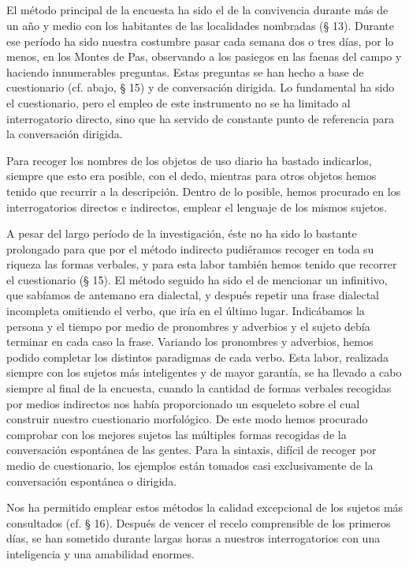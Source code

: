 \subsection{} El método principal de la encuesta ha sido el de la convivencia durante más de un año y medio con los habitantes de las localidades nombradas (§ 13). Durante ese período ha sido nuestra costumbre pasar cada semana dos o tres días, por lo menos, en los Montes de Pas, observando a los pasiegos en las faenas del campo y haciendo innumerables preguntas. Estas preguntas se han hecho a base de cuestionario (cf. abajo, § 15) y de conversación dirigida. Lo fundamental ha sido el cuestionario, pero el empleo de este instrumento no se ha limitado al interrogatorio directo, sino que ha servido de constante punto de referencia para la conversación dirigida. 

Para recoger los nombres de los objetos de uso diario ha bastado indicarlos, siempre que esto era posible, con el dedo, mientras para otros objetos hemos tenido que recurrir a la descripción. Dentro de lo posible, hemos procurado en los interrogatorios directos e indirectos, emplear el lenguaje de los mismos sujetos. 

A pesar del largo período de la investigación, éste no ha sido lo bastante prolongado para que por el método indirecto pudiéramos recoger en toda su riqueza las formas verbales, y para esta labor también hemos tenido que recorrer el cuestionario (§ 15). El método seguido ha sido el de mencionar un infinitivo, que sabíamos de antemano era dialectal, y después repetir una frase dialectal incompleta omitiendo el verbo, que iría en el último lugar. Indicábamos la persona y el tiempo por medio de pronombres y adverbios y el sujeto debía terminar en cada caso la frase. Variando los pronombres y adverbios, hemos podido completar los distintos paradigmas de cada verbo. Esta labor, realizada siempre con los sujetos más inteligentes y de mayor garantía, se ha llevado a cabo siempre al final de la encuesta, cuando la cantidad de formas verbales recogidas por medios indirectos nos había proporcionado un esqueleto sobre el cual construir nuestro cuestionario morfológico. De este modo hemos procurado comprobar con los mejores sujetos las múltiples formas recogidas de la conversación espontánea de las gentes. Para la sintaxis, difícil de recoger por medio de cuestionario, los ejemplos están tomados casi exclusivamente de la conversación espontánea o dirigida. 

Nos ha permitido emplear estos métodos la calidad excepcional de los sujetos más consultados (cf. § 16). Después de vencer el recelo comprensible de los primeros días, se han sometido durante largas horas a nuestros interrogatorios con una inteligencia y una amabilidad enormes.

